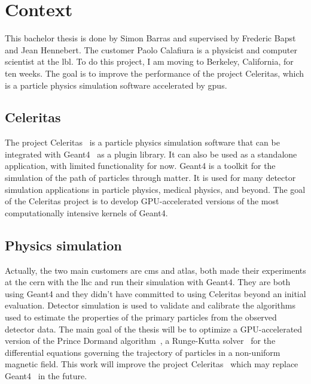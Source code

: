 \chapter{Context}
\label{spec:ch:context}

This bachelor thesis is done by Simon Barras and supervised by Frederic Bapst and Jean Hennebert.
The customer Paolo Calafiura is a physicist and computer scientist at the \acrfull{lbl}.
To do this project, I am moving to Berkeley, California, for ten weeks.
The goal is to improve the performance of the project Celeritas, which is a particle physics simulation software accelerated by \acrshort{gpu}s.




\section{Celeritas}
\label{spec:ch:context:celeritas}

The project Celeritas~\cite{Celeritas-Project} is a particle physics simulation software that can be integrated with Geant4~\cite{Geant4} as a plugin library.
It can also be used as a standalone application, with limited functionality for now.
Geant4 is a toolkit for the simulation of the path of particles through matter.
It is used for many detector simulation applications in particle physics, medical physics, and beyond.
The goal of the Celeritas project is to develop GPU-accelerated versions of the most computationally intensive kernels of Geant4.

\section{Physics simulation}
\label{spec:ch:context:physics-simulation}

Actually, the two main customers are \acrshort{cms} and \acrshort{atlas}, both made their experiments at the \acrfull{cern} with the \acrfull{lhc} and run their simulation with Geant4.
They are both using Geant4 and they didn't have committed to using Celeritas beyond an initial evaluation.
Detector simulation is used to validate and calibrate the algorithms used to estimate the properties of the primary particles from the observed detector data.
The main goal of the thesis will be to optimize a GPU-accelerated version of the Prince Dormand algorithm~\cite{princeDormand}, a Runge-Kutta solver~\cite{Runge-Kutta-methods} for the differential equations governing the trajectory of particles in a non-uniform magnetic field.
This work will improve the project Celeritas~\cite{Celeritas-Project} which may replace Geant4~\cite{Geant4} in the future.

